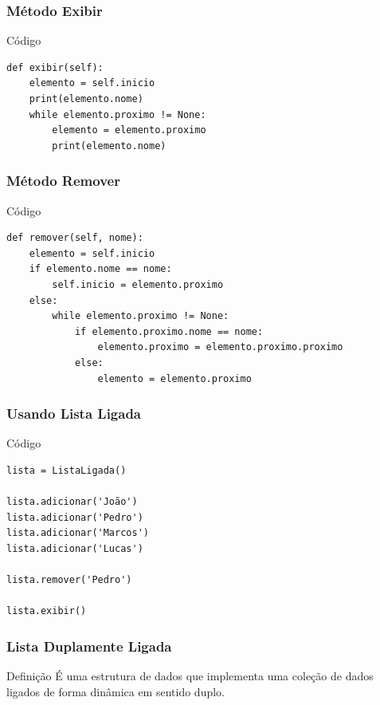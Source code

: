 \documentclass{beamer}
\begin{document}
\begin{frame}[fragile]
\frametitle{Método Exibir}

\begin{exampleblock}{Código}
	\begin{lstlisting}
def exibir(self):
    elemento = self.inicio
    print(elemento.nome)
    while elemento.proximo != None:
        elemento = elemento.proximo
        print(elemento.nome)
	\end{lstlisting}
\end{exampleblock}
\end{frame}

\begin{frame}[fragile]
\frametitle{Método Remover}

\begin{exampleblock}{Código}

\begin{lstlisting}
def remover(self, nome):
    elemento = self.inicio
    if elemento.nome == nome:
        self.inicio = elemento.proximo
    else:
        while elemento.proximo != None:
            if elemento.proximo.nome == nome:
                elemento.proximo = elemento.proximo.proximo
            else:
                elemento = elemento.proximo
\end{lstlisting}

\end{exampleblock}
\end{frame}

\begin{frame}[fragile]
\frametitle{Usando Lista Ligada}

\begin{exampleblock}{Código}
	
\begin{lstlisting}
lista = ListaLigada()

lista.adicionar('João')
lista.adicionar('Pedro')
lista.adicionar('Marcos')
lista.adicionar('Lucas')

lista.remover('Pedro')

lista.exibir()
\end{lstlisting}
	
\end{exampleblock}
\end{frame}

\begin{frame}
\frametitle{Lista Duplamente Ligada}

\begin{block}{Definição}
É uma estrutura de dados que implementa uma coleção de dados ligados de forma dinâmica em sentido duplo.
\end{block}
\end{frame}
\end{document}
